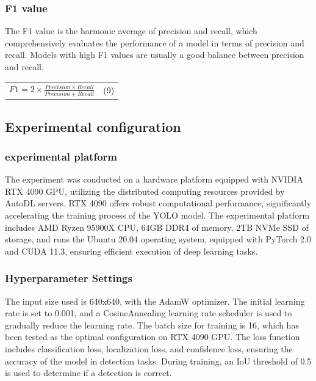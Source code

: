 \documentclass[
]{article}
\newcounter{none} %
\begin{document}
\subsubsection{F1 value}\label{f1-value}

The F1 value is the harmonic average of precision and recall, which
comprehensively evaluates the performance of a model in terms of
precision and recall. Models with high F1 values are usually a good
balance between precision and recall.

{\def\LTcaptype{none} %
\begin{longtable}[]{@{}
  >{\raggedright\arraybackslash}p{}
  >{\centering\arraybackslash}p{}@{}}
\toprule\noalign{}
\endhead
\bottomrule\noalign{}
\endlastfoot
\(F1 = 2 \times \frac{Precision \times Recall}{Precision + Recall}\) &
(9) \\
\end{longtable}
}

\subsection{Experimental
configuration}\label{experimental-configuration}

\subsubsection{experimental platform}\label{experimental-platform}

The experiment was conducted on a hardware platform equipped with NVIDIA
RTX 4090 GPU, utilizing the distributed computing resources provided by
AutoDL servers. RTX 4090 offers robust computational performance,
significantly accelerating the training process of the YOLO model. The
experimental platform includes AMD Ryzen 95900X CPU, 64GB DDR4 of
memory, 2TB NVMe SSD of storage, and runs the Ubuntu 20.04 operating
system, equipped with PyTorch 2.0 and CUDA 11.3, ensuring efficient
execution of deep learning tasks.

\subsubsection{Hyperparameter Settings}\label{hyperparameter-settings}

The input size used is 640x640, with the AdamW optimizer. The initial
learning rate is set to 0.001, and a CosineAnnealing learning rate
scheduler is used to gradually reduce the learning rate. The batch size
for training is 16, which has been tested as the optimal configuration
on RTX 4090 GPU. The loss function includes classification loss,
localization loss, and confidence loss, ensuring the accuracy of the
model in detection tasks. During training, an IoU threshold of 0.5 is
used to determine if a detection is correct.
\end{document}
